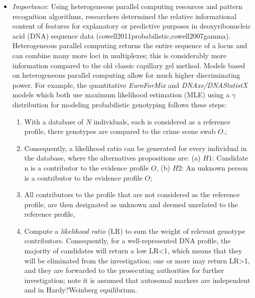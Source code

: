 \documentclass[10pt]{article}[draft]
\begin{document}
\begin{itemize}
	\item  \emph{Importance}: Using heterogeneous parallel computing resources and pattern recognition algorithms, researchers  determined the relative informational content of features for explanatory or predictive purposes in  deoxyribonucleic acid  (DNA) sequence data (cowell2011probabilistic,cowell2007gamma). Heterogeneous parallel computing returns the entire sequence of a locus and can combine many more loci in multiplexes; this is considerably more information  compared to the old classic capillary gel method. Models based on heterogeneous parallel computing allow for much higher discriminating power. For example, the  quantitative \emph{EuroForMix} and \emph{DNAxs/DNAStatistX}  models which both use maximum likelihood estimation (MLE) using a $\gamma$ distribution for modeling probabilistic genotyping follows these steps:
	\begin{enumerate} 
		\item  With a database of $N$ individuals, each is considered as a  reference profile, there genotypes are compared to the crime scene swab $O$.; 
		\item Consequently, a likelihood ratio can be generated for every individual in the database, where the alternatives propositions are:  (a) $H1$: Candidate n is a contributor to the evidence profile $O$, (b) $H2$: An unknown person is a contributor to the evidence profile $O$;  
		\item All contributors to the profile that are not  considered as the reference profile, are then designated as unknown and deemed unrelated to the reference profile, 
		\item  Compute a \emph{likelihood ratio} (LR) to sum the weight of relevant genotype contributors. Consequently, for a well-represented DNA profile, the majority of candidates will return a low LR<1, which means that they will be eliminated from the investigation; one or more may return LR>1, and they are forwarded to the prosecuting authorities for further investigation; note it is assumed that autosomal markers are independent and in Hardy?Weinberg equilibrium. 
\end{enumerate}


\end{itemize}
\end{document}
